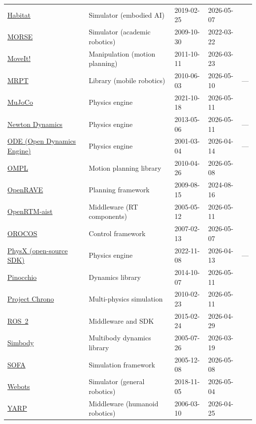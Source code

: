 \begin{longtable}{@{}P{2.5cm}P{3.0cm}llP{2.7cm}@{}}
\href{https://aihabitat.org}{Habitat} & Simulator (embodied AI) & 2019-02-25 & 2026-05-07 & \citet{sw_habitat} \\
\href{https://morse-simulator.github.io}{MORSE} & Simulator (academic robotics) & 2009-10-30 & 2022-03-22 & \citet{sw_morse} \\
\href{https://moveit.ai}{MoveIt!} & Manipulation (motion planning) & 2011-10-11 & 2026-03-23 & \citet{sw_moveit} \\
\href{https://www.mrpt.org}{MRPT} & Library (mobile robotics) & 2010-06-03 & 2026-05-10 & --- \\
\href{https://mujoco.org}{MuJoCo} & Physics engine & 2021-10-18 & 2026-05-11 & \citet{sw_mujoco} \\
\href{https://github.com/JulioJerez/newton-dynamics}{Newton Dynamics} & Physics engine & 2013-05-06 & 2026-05-11 & --- \\
\href{https://www.ode.org}{ODE (Open Dynamics Engine)} & Physics engine & 2001-03-04 & 2026-04-14 & --- \\
\href{https://ompl.kavrakilab.org}{OMPL} & Motion planning library & 2010-04-26 & 2026-05-08 & \citet{sw_ompl} \\
\href{http://openrave.org}{OpenRAVE} & Planning framework & 2009-08-15 & 2024-08-16 & \citet{sw_openrave} \\
\href{https://www.openrtm.org}{OpenRTM-aist} & Middleware (RT components) & 2005-05-12 & 2026-05-11 & \citet{sw_openrtm} \\
\href{https://www.orocos.org}{OROCOS} & Control framework & 2007-02-13 & 2026-05-07 & \citet{sw_orocos} \\
\href{https://developer.nvidia.com/physx-sdk}{PhysX (open-source SDK)} & Physics engine & 2022-11-08 & 2026-04-13 & --- \\
\href{https://stack-of-tasks.github.io/pinocchio}{Pinocchio} & Dynamics library & 2014-10-07 & 2026-05-11 & \citet{sw_pinocchio} \\
\href{https://projectchrono.org}{Project Chrono} & Multi-physics simulation & 2010-02-23 & 2026-05-11 & \citet{sw_chrono} \\
\href{https://ros.org}{ROS~2} & Middleware and SDK & 2015-02-24 & 2026-04-29 & \citet{sw_ros2} \\
\href{https://simtk.org/projects/simbody}{Simbody} & Multibody dynamics library & 2005-07-26 & 2026-03-19 & \citet{sw_simbody} \\
\href{https://www.sofa-framework.org}{SOFA} & Simulation framework & 2005-12-08 & 2026-05-08 & \citet{sw_sofa} \\
\href{https://cyberbotics.com}{Webots} & Simulator (general robotics) & 2018-11-05 & 2026-05-04 & \citet{sw_webots} \\
\href{https://www.yarp.it}{YARP} & Middleware (humanoid robotics) & 2006-03-10 & 2026-04-25 & \citet{sw_yarp} \\
\end{longtable}
\endgroup

